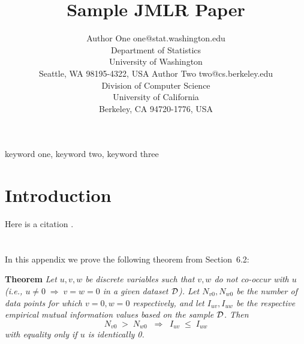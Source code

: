 \documentclass[twoside,11pt]{article}
\newcommand{\dataset}{{\cal D}}
\begin{document}
\title{Sample JMLR Paper}

\author{\name Author One \email one@stat.washington.edu \\
       \addr Department of Statistics\\
       University of Washington\\
       Seattle, WA 98195-4322, USA
       \AND
       \name Author Two \email two@cs.berkeley.edu \\
       \addr Division of Computer Science\\
       University of California\\
       Berkeley, CA 94720-1776, USA}


\maketitle

\begin{abstract}%
\blindtext
\end{abstract}

\begin{keywords}
  keyword one, keyword two, keyword three
\end{keywords}

\section{Introduction}

\blindmathpaper

Here is a citation \cite{chow:68}.


\newpage

\appendix
\section{}
\label{app:theorem}

In this appendix we prove the following theorem from
Section~6.2:

\noindent
{\bf Theorem} {\it Let $u,v,w$ be discrete variables such that $v, w$ do
not co-occur with $u$ (i.e., $u\neq0\;\Rightarrow \;v=w=0$ in a given
dataset $\dataset$). Let $N_{v0},N_{w0}$ be the number of data points for
which $v=0, w=0$ respectively, and let $I_{uv},I_{uw}$ be the
respective empirical mutual information values based on the sample
$\dataset$. Then
\[
	N_{v0} \;>\; N_{w0}\;\;\Rightarrow\;\;I_{uv} \;\leq\;I_{uw}
\]
with equality only if $u$ is identically 0.} \hfill\BlackBox
\end{document}

